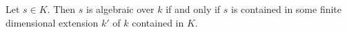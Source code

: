 Let $s \in K$. Then $s$ is algebraic over $k$ if and only if $s$ is contained in some finite dimensional extension $k'$ of $k$ contained in $K$.
